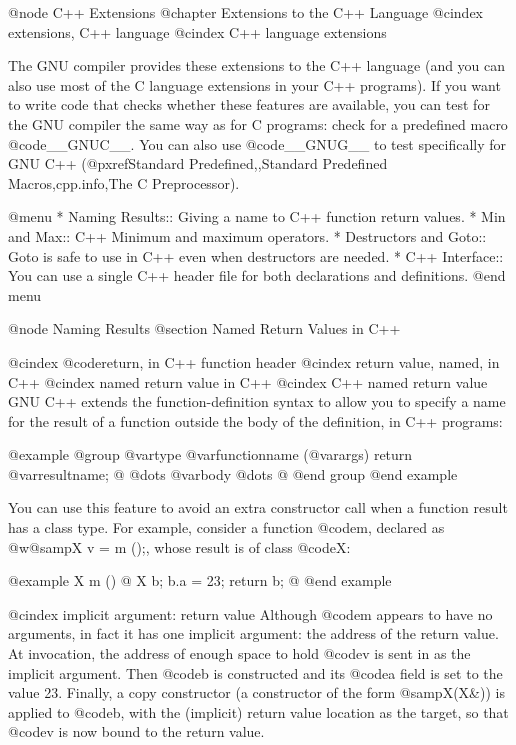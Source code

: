 {{{{{@node C++ Extensions
@chapter Extensions to the C++ Language
@cindex extensions, C++ language
@cindex C++ language extensions

The GNU compiler provides these extensions to the C++ language (and you
can also use most of the C language extensions in your C++ programs).  If you
want to write code that checks whether these features are available, you can
test for the GNU compiler the same way as for C programs: check for a
predefined macro @code{__GNUC__}.  You can also use @code{__GNUG__} to
test specifically for GNU C++ (@pxref{Standard Predefined,,Standard
Predefined Macros,cpp.info,The C Preprocessor}).

@menu
* Naming Results::      Giving a name to C++ function return values.
* Min and Max::		C++ Minimum and maximum operators.
* Destructors and Goto:: Goto is safe to use in C++ even when destructors
                           are needed.
* C++ Interface::       You can use a single C++ header file for both
                         declarations and definitions.
@end menu

@node Naming Results
@section Named Return Values in C++

@cindex @code{return}, in C++ function header
@cindex return value, named, in C++
@cindex named return value in C++
@cindex C++ named return value
GNU C++ extends the function-definition syntax to allow you to specify a
name for the result of a function outside the body of the definition, in
C++ programs:

@example
@group
@var{type}
@var{functionname} (@var{args}) return @var{resultname};
@{ 
  @dots{}
  @var{body}
  @dots{}
@}
@end group
@end example

You can use this feature to avoid an extra constructor call when
a function result has a class type.  For example, consider a function
@code{m}, declared as @w{@samp{X v = m ();}}, whose result is of class
@code{X}:

@example
X
m ()
@{
  X b;
  b.a = 23;
  return b; 
@}
@end example

@cindex implicit argument: return value
Although @code{m} appears to have no arguments, in fact it has one implicit
argument: the address of the return value.  At invocation, the address
of enough space to hold @code{v} is sent in as the implicit argument.
Then @code{b} is constructed and its @code{a} field is set to the value
23.  Finally, a copy constructor (a constructor of the form @samp{X(X&)})
is applied to @code{b}, with the (implicit) return value location as the
target, so that @code{v} is now bound to the return value.

}}}}}
